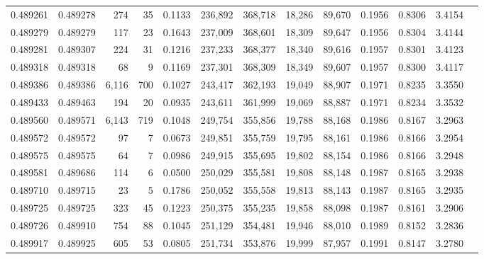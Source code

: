 \begin{tabular}{rrrrrrrrrrrrr}
0.489261 & 0.489278 &   274 &    35 &                                     0.1133 & 236,892 & 368,718 &  18,286 &  89,670 & 0.1956 & 0.8306 & 3.4154 \\
0.489279 & 0.489279 &   117 &    23 &                                     0.1643 & 237,009 & 368,601 &  18,309 &  89,647 & 0.1956 & 0.8304 & 3.4144 \\
0.489281 & 0.489307 &   224 &    31 &                                     0.1216 & 237,233 & 368,377 &  18,340 &  89,616 & 0.1957 & 0.8301 & 3.4123 \\
0.489318 & 0.489318 &    68 &     9 &                                     0.1169 & 237,301 & 368,309 &  18,349 &  89,607 & 0.1957 & 0.8300 & 3.4117 \\
0.489386 & 0.489386 & 6,116 &   700 &                                     0.1027 & 243,417 & 362,193 &  19,049 &  88,907 & 0.1971 & 0.8235 & 3.3550 \\
0.489433 & 0.489463 &   194 &    20 &                                     0.0935 & 243,611 & 361,999 &  19,069 &  88,887 & 0.1971 & 0.8234 & 3.3532 \\
0.489560 & 0.489571 & 6,143 &   719 &                                     0.1048 & 249,754 & 355,856 &  19,788 &  88,168 & 0.1986 & 0.8167 & 3.2963 \\
0.489572 & 0.489572 &    97 &     7 &                                     0.0673 & 249,851 & 355,759 &  19,795 &  88,161 & 0.1986 & 0.8166 & 3.2954 \\
0.489575 & 0.489575 &    64 &     7 &                                     0.0986 & 249,915 & 355,695 &  19,802 &  88,154 & 0.1986 & 0.8166 & 3.2948 \\
0.489581 & 0.489686 &   114 &     6 &                                     0.0500 & 250,029 & 355,581 &  19,808 &  88,148 & 0.1987 & 0.8165 & 3.2938 \\
0.489710 & 0.489715 &    23 &     5 &                                     0.1786 & 250,052 & 355,558 &  19,813 &  88,143 & 0.1987 & 0.8165 & 3.2935 \\
0.489725 & 0.489725 &   323 &    45 &                                     0.1223 & 250,375 & 355,235 &  19,858 &  88,098 & 0.1987 & 0.8161 & 3.2906 \\
0.489726 & 0.489910 &   754 &    88 &                                     0.1045 & 251,129 & 354,481 &  19,946 &  88,010 & 0.1989 & 0.8152 & 3.2836 \\
0.489917 & 0.489925 &   605 &    53 &                                     0.0805 & 251,734 & 353,876 &  19,999 &  87,957 & 0.1991 & 0.8147 & 3.2780 \\

\end{tabular}
